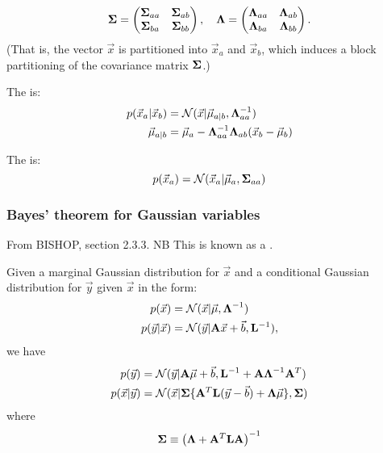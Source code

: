 \documentclass[11pt]{article}
\begin{document}
\begin{appendices}
\begin{equation}
  \boldsymbol{\Sigma} =
  \left(
    \begin{matrix}
      \boldsymbol{\Sigma}_{aa} & \boldsymbol{\Sigma}_{ab} \\
      \boldsymbol{\Sigma}_{ba} & \boldsymbol{\Sigma}_{bb}
    \end{matrix}
  \right)
  , \quad
  \boldsymbol{\Lambda} =
  \left(
    \begin{matrix}
      \boldsymbol{\Lambda}_{aa} & \boldsymbol{\Lambda}_{ab} \\
      \boldsymbol{\Lambda}_{ba} & \boldsymbol{\Lambda}_{bb}
    \end{matrix}
  \right).
\end{equation}
(That is, the vector $\vec{x}$ is partitioned into $\vec{x}_a$ and $\vec{x}_b$, which
induces a block partitioning of the covariance matrix $\boldsymbol{\Sigma}$.)

The  is:
\begin{align}
  p(\vec{x}_a | \vec{x}_b) &= \mathcal{N}(\vec{x} | \vec{\mu}_{a | b},
                              \boldsymbol{\Lambda}_{aa}^{-1}) \\ 
  \vec{\mu}_{a | b}        &= \vec{\mu}_a - \boldsymbol{\Lambda}_{aa}^{-1} \boldsymbol{\Lambda}_{ab}
                              (\vec{x}_b - \vec{\mu}_b) 
\end{align}

The  is:
\begin{equation}
  p(\vec{x}_a) = \mathcal{N}(\vec{x}_a | \vec{\mu}_a, \boldsymbol{\Sigma}_{aa})
\end{equation}

\subsubsection{Bayes' theorem for Gaussian variables}
From BISHOP, section 2.3.3. NB This is known as a .

Given a marginal Gaussian distribution for $\vec{x}$ and a conditional Gaussian
distribution for $\vec{y}$ given $\vec{x}$ in the form:
\begin{align}
  p(\vec{x})         &= \mathcal{N}(\vec{x} | \vec{\mu}, \boldsymbol{\Lambda}^{-1}) \\
  p(\vec{y}|\vec{x}) &= \mathcal{N}(\vec{y} | \mathbf{A} \vec{x} + \vec{b}, \mathbf{L}^{-1}),
\end{align}
we have
\begin{align}
  p(\vec{y})         &= \mathcal{N} (\vec{y} |\mathbf{A} \vec{\mu} + \vec{b}, \mathbf{L}^{-1}
                        + \mathbf{A}\boldsymbol{\Lambda}^{-1} \mathbf{A}^T ) \\
  p(\vec{x}|\vec{y}) &= \mathcal{N} ( \vec{x} | \boldsymbol{\Sigma} \{ \mathbf{A}^T \mathbf{L}
                        (\vec{y} - \vec{b}) + \boldsymbol{\Lambda} \vec{\mu} \}, \boldsymbol{\Sigma})
\end{align}
where
\begin{equation}
  \boldsymbol{\Sigma} \equiv \left(\boldsymbol{\Lambda} + \mathbf{A}^T \mathbf{LA} \right)^{-1}
\end{equation}



\end{appendices}
\end{document}
